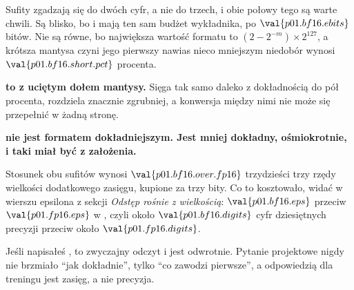 \begin{fr}
Sufity zgadzają się do dwóch cyfr, a nie do trzech, i obie połowy tego są
warte chwili. Są blisko, bo  i  mają ten sam budżet
wykładnika, po $\val{p01.bf16.ebits}$ bitów. Nie są równe, bo największa
wartość formatu to $(2 - 2^{-m}) \times 2^{127}$, a krótsza mantysa
 czyni jego pierwszy nawias nieco mniejszym \dash{} niedobór
wynosi $\val{p01.bf16.short.pct}$ procenta.

\textbf{ to  z uciętym dołem mantysy.} Sięga tak samo
daleko z dokładnością do pół procenta, rozdziela znacznie zgrubniej, a
konwersja między nimi nie może się przepełnić w żadną stronę.

\begin{trapbox}
\textbf{ nie jest formatem dokładniejszym. Jest mniej dokładny,
ośmiokrotnie, i taki miał być z założenia.}

Stosunek obu sufitów wynosi $\val{p01.bf16.over.fp16}$ \dash{} trzydzieści
trzy rzędy wielkości dodatkowego zasięgu, kupione za trzy bity. Co to
kosztowało, widać w wierszu epsilona z sekcji \emph{Odstęp rośnie z
wielkością}: $\val{p01.bf16.eps}$ przeciw $\val{p01.fp16.eps}$ w ,
czyli około $\val{p01.bf16.digits}$ cyfr dziesiętnych precyzji przeciw około
$\val{p01.fp16.digits}$.

Jeśli napisałeś , to zwyczajny odczyt i jest odwrotnie.
Pytanie projektowe nigdy nie brzmiało \enquote{jak dokładnie},
tylko \enquote{co zawodzi pierwsze}, a odpowiedzią dla treningu jest zasięg, a
nie precyzja.
\end{trapbox}
\end{fr}

